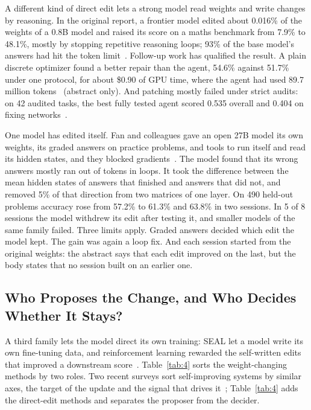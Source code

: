 \documentclass[journal]{IEEEtran}
\begin{document}
A different kind of direct edit lets a strong model read weights and write changes by reasoning. In the original report, a frontier model edited about 0.016\% of the weights of a 0.8B model and raised its score on a maths benchmark from 7.9\% to 48.1\%, mostly by stopping repetitive reasoning loops; 93\% of the base model's answers had hit the token limit~\cite{Takehi2026}. Follow-up work has qualified the result. A plain discrete optimizer found a better repair than the agent, 54.6\% against 51.7\% under one protocol, for about \$0.90 of GPU time, where the agent had used 89.7 million tokens~\cite{Salloum2026} (abstract only). And patching mostly failed under strict audits: on 42 audited tasks, the best fully tested agent scored 0.535 overall and 0.404 on fixing networks~\cite{Marasini2026}.

One model has edited itself. Fan and colleagues gave an open 27B model its own weights, its graded answers on practice problems, and tools to run itself and read its hidden states, and they blocked gradients~\cite{Fan2026}. The model found that its wrong answers mostly ran out of tokens in loops. It took the difference between the mean hidden states of answers that finished and answers that did not, and removed 5\% of that direction from two matrices of one layer. On 490 held-out problems accuracy rose from 57.2\% to 61.3\% and 63.8\% in two sessions. In 5 of 8 sessions the model withdrew its edit after testing it, and smaller models of the same family failed. Three limits apply. Graded answers decided which edit the model kept. The gain was again a loop fix. And each session started from the original weights: the abstract says that each edit improved on the last, but the body states that no session built on an earlier one.

\subsection{Who Proposes the Change, and Who Decides Whether It Stays?}\label{sec:6.4}

A third family lets the model direct its own training: SEAL let a model write its own fine-tuning data, and reinforcement learning rewarded the self-written edits that improved a downstream score~\cite{Zweiger2025}. Table~\ref{tab:4} sorts the weight-changing methods by two roles. Two recent surveys sort self-improving systems by similar axes, the target of the update and the signal that drives it~\cite{Ren2026,Yang2026}; Table~\ref{tab:4} adds the direct-edit methods and separates the proposer from the decider.
\end{document}
